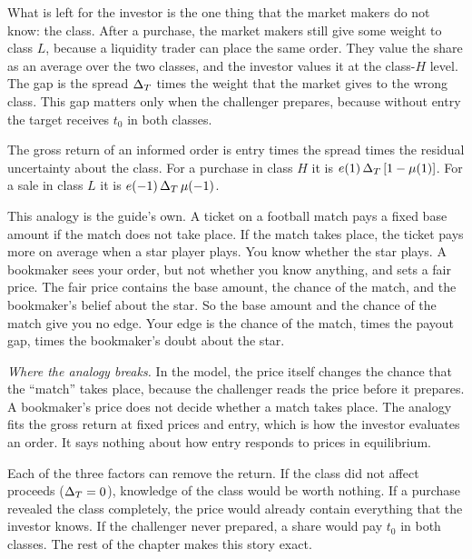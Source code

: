 What is left for the investor is the one thing that the market makers do not know: the class. After a purchase,
the market makers still give some weight to class \(L\), because a liquidity trader can place the same
order. They value the share as an average over the two classes, and the investor values it at the class-\(H\)
level. The gap is the spread \(\Delta_T\) times the weight that the market gives to the wrong class. This gap matters
only when the challenger prepares, because without entry the target receives \(t_0\) in both classes.

\begin{keyidea}
The gross return of an informed order is entry times the spread times the residual uncertainty about the class.
For a purchase in class \(H\) it is \(e(1)\,\Delta_T\,[1-\mu(1)]\). For a sale in class \(L\) it is
\(e(-1)\,\Delta_T\,\mu(-1)\).
\end{keyidea}

\begin{analogy}
This analogy is the guide's own. A ticket on a football match pays a fixed base amount if the match does not take
place. If the match takes place, the ticket pays more on average when a star player plays. You know whether the
star plays. A bookmaker sees your order, but not whether you know anything, and sets a fair price. The fair price
contains the base amount, the chance of the match, and the bookmaker's belief about the star. So the base amount
and the chance of the match give you no edge. Your edge is the chance of the match, times the payout gap, times
the bookmaker's doubt about the star.

\emph{Where the analogy breaks.} In the model, the price itself changes the chance that the ``match'' takes place,
because the challenger reads the price before it prepares. A bookmaker's price does not decide whether a match
takes place. The analogy fits the gross return at fixed prices and entry, which is how the investor evaluates an
order. It says nothing about how entry responds to prices in equilibrium.
\end{analogy}

Each of the three factors can remove the return. If the class did not affect proceeds (\(\Delta_T=0\)), knowledge of
the class would be worth nothing. If a purchase revealed the class completely, the price would already contain
everything that the investor knows. If the challenger never prepared, a share would pay \(t_0\) in both classes.
The rest of the chapter makes this story exact.

